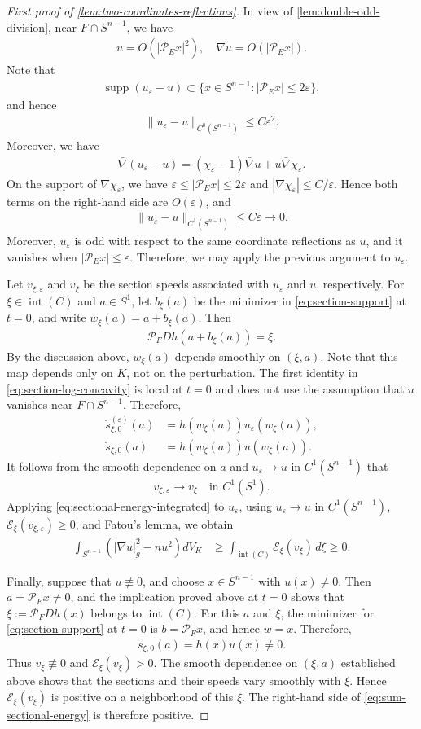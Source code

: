 \documentclass[12pt]{amsart}
\newcommand{\Sn}{S^{n-1}}
\newcommand{\eq}[1]{\begin{equation}\begin{alignedat}{2}#1\end{alignedat}\end{equation}}
\theoremstyle{plain}
\theoremstyle{definition}
\theoremstyle{remark}
\numberwithin{equation}{section}
\begin{document}
\begin{proof}[First proof of \autoref{lem:two-coordinates-reflections}]
In view of \autoref{lem:double-odd-division}, near $F\cap\Sn$, we have
\eq{
 u=O(|\mathcal{P}_{E}x|^2),\quad \bar{\nabla} u=O(|\mathcal{P}_{E}x|).
}
Note that 
\eq{
 \operatorname{supp}(u_{\varepsilon}-u)
 \subset\{x\in\Sn:|\mathcal{P}_Ex|\leq 2\varepsilon\},
}
and hence
\eq{
 \|u_{\varepsilon}-u\|_{C^0(\Sn)}\leq C\varepsilon^2.
}
Moreover, we have
\eq{
 \bar{\nabla}(u_{\varepsilon}-u)
 = (\chi_{\varepsilon}-1)\bar{\nabla}u+u\bar{\nabla}\chi_{\varepsilon}.
}
On the support of $\bar{\nabla}\chi_{\varepsilon}$, we have $\varepsilon\leq|\mathcal{P}_{E}x|\leq2\varepsilon$ and $|\bar{\nabla}\chi_{\varepsilon}|\leq C/\varepsilon$. Hence both terms on the right-hand side are $O(\varepsilon)$, and
\eq{
 \|u_{\varepsilon}-u\|_{C^1(\Sn)}\leq C\varepsilon\to 0.
}
Moreover, $u_{\varepsilon}$ is odd with respect to the same coordinate reflections as $u$, and it vanishes when $|\mathcal{P}_{E}x|\leq\varepsilon$. Therefore, we may apply the previous argument to $u_{\varepsilon}$.

Let $v_{\xi,\varepsilon}$ and $v_{\xi}$ be the section speeds associated with $u_{\varepsilon}$ and $u$, respectively. For $\xi\in\operatorname{int}(C)$ and $a\in S^1$, let $b_{\xi}(a)$ be the minimizer in \eqref{eq:section-support} at $t=0$, and write $w_{\xi}(a)=a+b_{\xi}(a)$. Then
\eq{
 \mathcal{P}_{F}Dh(a+b_{\xi}(a))=\xi.
}
By the discussion above, $w_{\xi}(a)$ depends smoothly on $(\xi,a)$. Note that this map depends only on $K$, not on the perturbation. The first identity in \eqref{eq:section-log-concavity} is local at $t=0$ and does not use the assumption that $u$ vanishes near $F\cap \Sn$. Therefore,
\eq{
 \dot{s}^{(\varepsilon)}_{\xi,0}(a)
 &=h(w_{\xi}(a))u_{\varepsilon}(w_{\xi}(a)),\\
 \dot{s}_{\xi,0}(a)&=h(w_{\xi}(a))u(w_{\xi}(a)).
}
It follows from the smooth dependence on $a$ and
$u_{\varepsilon}\to u$ in $C^1(\Sn)$ that
\eq{
 v_{\xi,\varepsilon}\to v_{\xi}
 \quad\text{in }C^1(S^1).
}
Applying \eqref{eq:sectional-energy-integrated} to $u_{\varepsilon}$, using $u_{\varepsilon}\to u$ in $C^1(\Sn)$, $\mathcal{E}_{\xi}(v_{\xi,\varepsilon})\geq 0$, and Fatou's lemma, we obtain
\eq{\label{eq:sum-sectional-energy}
 \int_{\Sn}\left(|\nabla u|_g^2-nu^2\right)dV_K
 &\geq\int_{\operatorname{int}(C)}
 \mathcal{E}_{\xi}(v_{\xi})\,d\xi\geq 0.
}

Finally, suppose that $u\not\equiv 0$, and choose $x\in\Sn$ with $u(x)\ne 0$. Then $a=\mathcal{P}_{E}x\ne 0$, and the implication proved above at $t=0$ shows that $\xi:=\mathcal{P}_{F}Dh(x)$ belongs to $\operatorname{int}(C)$. For this $a$ and $\xi$, the minimizer for \eqref{eq:section-support} at $t=0$ is $b=\mathcal{P}_{F}x$, and hence $w=x$. Therefore,
\eq{
 \dot{s}_{\xi,0}(a)=h(x)u(x)\ne 0.
}
Thus $v_{\xi}\not\equiv 0$ and $\mathcal{E}_{\xi}(v_{\xi})>0$. The smooth dependence on $(\xi,a)$ established above shows that the sections and their speeds vary smoothly with $\xi$. Hence $\mathcal{E}_{\xi}(v_{\xi})$ is positive on a neighborhood of this $\xi$. The right-hand side of \eqref{eq:sum-sectional-energy} is therefore positive.
\end{proof}
\end{document}
